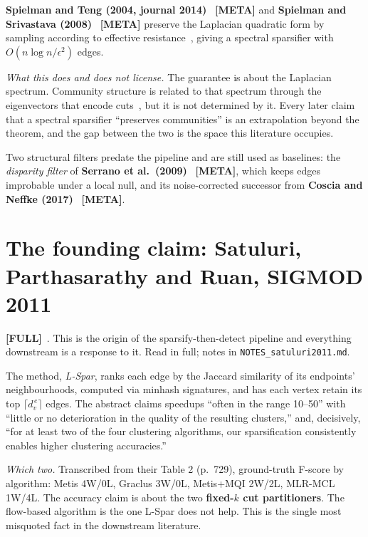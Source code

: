 \documentclass[10pt,a4paper]{article}
\begin{document}
\textbf{Spielman and Teng (2004, journal 2014)}~\cite{spielman2004nearly, spielman2014nearly}
\textbf{[META]} and \textbf{Spielman and Srivastava (2008)}~\cite{spielman2008graph}
\textbf{[META]} preserve the Laplacian quadratic form by sampling according to effective
resistance~\cite{lovasz1993random, doyle1984random}, giving a spectral sparsifier with
$O(n \log n / \epsilon^2)$ edges.

\emph{What this does and does not license.} The guarantee is about the Laplacian spectrum.
Community structure is related to that spectrum through the eigenvectors that encode
cuts~\cite{von2007tutorial, shi2000normalized, newman2013spectral}, but it is not determined by
it. Every later claim that a spectral sparsifier ``preserves communities'' is an extrapolation
beyond the theorem, and the gap between the two is the space this literature occupies.

Two structural filters predate the pipeline and are still used as baselines: the \emph{disparity
filter} of \textbf{Serrano et al.\ (2009)}~\cite{serrano2009extracting} \textbf{[META]}, which
keeps edges improbable under a local null, and its noise-corrected successor from
\textbf{Coscia and Neffke (2017)}~\cite{coscia2017backboning} \textbf{[META]}.

\section{The founding claim: Satuluri, Parthasarathy and Ruan, SIGMOD 2011}

\textbf{[FULL]}~\cite{satuluri2011local}. This is the origin of the sparsify-then-detect
pipeline and everything downstream is a response to it. Read in full; notes in
\texttt{NOTES\_satuluri2011.md}.

The method, \emph{L-Spar}, ranks each edge by the Jaccard similarity of its endpoints'
neighbourhoods, computed via minhash signatures, and has each vertex retain its top
$\lceil d_v^{\,e}\rceil$ edges. The abstract claims speedups ``often in the range 10--50'' with
``little or no deterioration in the quality of the resulting clusters,'' and, decisively,
``for at least two of the four clustering algorithms, our sparsification consistently enables
higher clustering accuracies.''

\emph{Which two.} Transcribed from their Table 2 (p.~729), ground-truth F-score by algorithm:
Metis 4W/0L, Graclus 3W/0L, Metis+MQI 2W/2L, MLR-MCL 1W/4L. The accuracy claim is about the two
\textbf{fixed-$k$ cut partitioners}. The flow-based algorithm is the one L-Spar does not help.
This is the single most misquoted fact in the downstream literature.
\end{document}
